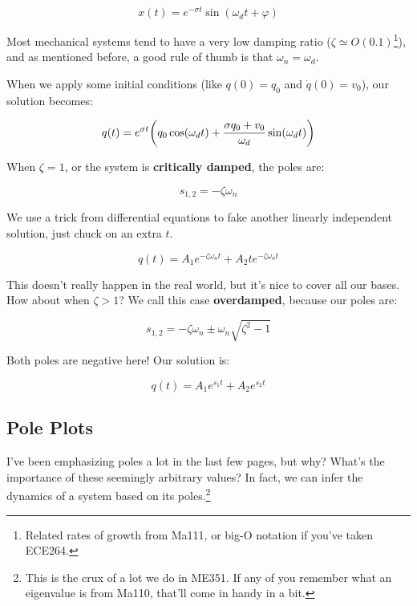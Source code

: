 \documentclass{article}
\begin{document}
\begin{onehalfspacing}
\begin{flushleft}
\vspace{-0.1in}
\[x(t) = e^{-\sigma t} \sin(\omega_d t + \varphi)\]

Most mechanical systems tend to have a very low damping ratio (\(\zeta \simeq O(0.1)\)\footnote{Related rates of growth from Ma111, or big-O notation if you've taken ECE264.}), and as mentioned before, a good rule of thumb is that \(\omega_n = \omega_d\).

\medskip

When we apply some initial conditions (like \(q(0) = q_0\) and \(\dot{q}(0) = v_0\)), our solution becomes:

\vspace{-0.1in}
\[q(t) = e^{\sigma t} \qty(q_0 \cos(\omega_d t) + \frac{\sigma q_0 + v_0}{\omega_d} \sin(\omega_d t))\]

When \(\zeta = 1\), or the system is \textbf{critically damped}, the poles are:

\vspace{-0.1in}
\[s_{1, 2} = -\zeta \omega_n\]

We use a trick from differential equations to fake another linearly independent solution, just chuck on an extra \(t\).

\vspace{-0.1in}
\[q(t) = A_1 e^{-\zeta \omega_n t} + A_2 t e^{-\zeta \omega_n t}\]

This doesn't really happen in the real world, but it's nice to cover all our bases. How about when \(\zeta > 1\)? We call this case \textbf{overdamped}, because our poles are:

\vspace{-0.1in}
\[s_{1, 2} = -\zeta \omega_n \pm \omega_n \sqrt{\zeta^2 - 1}\]

Both poles are negative here! Our solution is:

\vspace{-0.1in}
\[q(t) = A_1 e^{s_1 t} + A_2 e^{s_2 t}\]

\subsection{Pole Plots}

I've been emphasizing poles a lot in the last few pages, but why? What's the importance of these seemingly arbitrary values? In fact, we can infer the dynamics of a system based on its poles.\footnote{This is the crux of a lot we do in ME351. If any of you remember what an eigenvalue is from Ma110, that'll come in handy in a bit.}


\end{flushleft}
\end{onehalfspacing}
\end{document}
